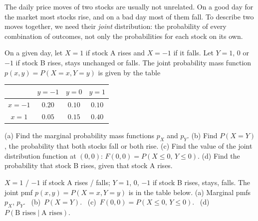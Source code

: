 
\begin{problem}
	\begin{context}
		The daily price moves of two stocks are usually not unrelated. On a good
		day for the market most stocks rise, and on a bad day most of them fall.
		To describe two moves together, we need their \emph{joint}
		distribution: the probability of every combination of outcomes, not
		only the probabilities for each stock on its own.
	\end{context}
	On a given day, let $X=1$ if stock A rises and $X=-1$ if it falls. Let
	$Y=1$, $0$ or $-1$ if stock B rises, stays unchanged or falls. The joint
	probability mass function $p(x,y)=P(X=x,Y=y)$ is given by the table
	\begin{center}
		\renewcommand{\arraystretch}{1.2}
		\begin{tabular}{c|ccc}
			         & $y=-1$ & $y=0$  & $y=1$  \\
			\hline
			$x=-1$   & $0.20$ & $0.10$ & $0.10$ \\
			$x=1$    & $0.05$ & $0.15$ & $0.40$
		\end{tabular}
	\end{center}
	(a) Find the marginal probability mass functions $p_X$ and $p_Y$.
	(b) Find $P(X=Y)$, the probability that both stocks fall or both rise.
	(c) Find the value of the joint distribution function at $(0,0)$:
	$F(0,0)=P(X\le0,\,Y\le0)$.
	(d) Find the probability that stock B rises, given that stock A rises.
\end{problem}

\begin{slideproblem}
	$X=1$ / $-1$ if stock A rises / falls; $Y=1$, $0$, $-1$ if stock B rises,
	stays, falls. The joint pmf $p(x,y)=P(X=x,Y=y)$ is in the table below.
	(a) Marginal pmfs $p_X$, $p_Y$. \ (b)~$P(X=Y)$. \
	(c)~$F(0,0)=P(X\le0,\,Y\le0)$. \ (d)~$P(\text{B rises}\mid\text{A rises})$.
\end{slideproblem}

